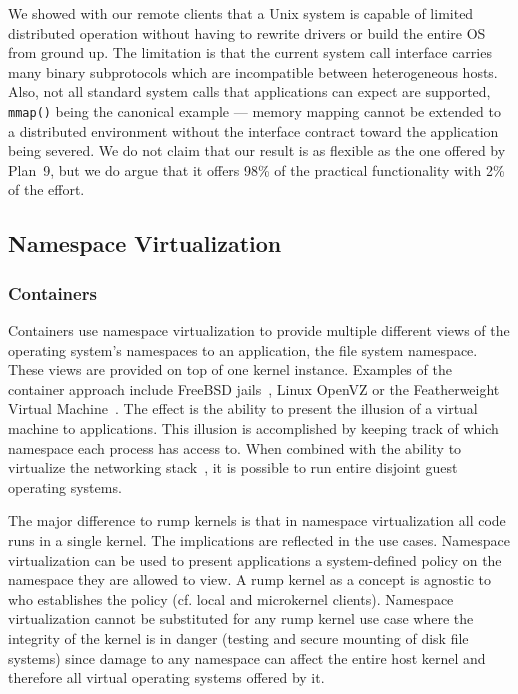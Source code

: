 We showed with our remote clients that a Unix system is capable of
limited distributed operation without having to rewrite drivers or
build the entire OS from ground up.  The limitation is that the
current system call interface carries many binary subprotocols
which are incompatible between heterogeneous hosts.  Also, not all
standard system calls that applications can expect are supported,
\texttt{mmap()} being the canonical example --- memory mapping
cannot be extended to a distributed environment without the interface
contract toward the application being severed.  We do not claim
that our result is as flexible as the one offered by Plan~9, but
we do argue that it offers 98\% of the practical functionality with
2\% of the effort.

\subsection{Namespace Virtualization}

\subsubsection*{Containers}

Containers use namespace virtualization to provide multiple
different views of the operating system's namespaces to an application, \eg the file
system namespace.  These views are provided on top of one kernel instance.
Examples of the container approach include FreeBSD jails~\cite{phk:jails}, Linux
OpenVZ or the Featherweight Virtual Machine~\cite{yu:fvm}.  The effect is
the ability to present the illusion of a virtual machine to applications.
This illusion is accomplished by keeping track of which namespace each
process has access to.  When combined with the ability to virtualize
the networking stack~\cite{zec:vimage}, it is possible to run entire
disjoint guest operating systems.

The major difference to rump kernels is that in namespace virtualization
all code runs in a single kernel.  The implications are
reflected in the use cases.  Namespace virtualization can be used to
present applications a system-defined policy on the namespace they
are allowed to view.  A rump kernel as a concept is agnostic to who
establishes the policy (cf. local and microkernel clients).
Namespace virtualization cannot be substituted for any rump kernel
use case where the integrity of the kernel is in danger (\eg testing
and secure mounting of disk file systems) since damage to any
namespace can affect the entire host kernel and therefore all
virtual operating systems offered by it.

